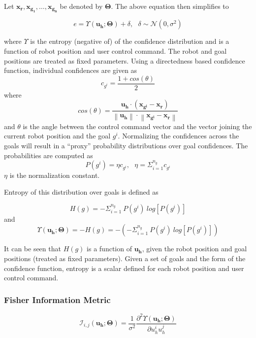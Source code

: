 \documentclass[]{article}
\newcommand{\norm}[1]{\left\lVert#1\right\rVert}
\begin{document}
\noindent Let $\boldsymbol{x_r}, \boldsymbol{x_{g_1}},\dots,\boldsymbol{x_{g_n}}$ be denoted by $\boldsymbol{\Theta}$. The above equation then simplifies to 

\begin{equation*}
e = \Upsilon(\boldsymbol{u_h}; \boldsymbol{\Theta}) + \delta, ~~~ \delta \sim \mathcal{N}(0, \sigma^2)
\end{equation*}


where $\Upsilon$ is the entropy (negative of) of the confidence distribution and is a function of robot position and user control command. The robot and goal positions are treated as fixed parameters. 
Using a directedness based confidence function, individual confidences are given as 
\begin{equation*}
c_{g^i} = \frac{1 + cos(\theta)}{2}
\end{equation*}
where 
\begin{equation*}
cos(\theta) = \frac{\boldsymbol{u_h}\cdot(\boldsymbol{x_{g^i}} - \boldsymbol{x_r})}{\norm{\boldsymbol{u_h}}\cdot\norm{\boldsymbol{x_{g^i}} - \boldsymbol{x_r}}}
\end{equation*}
and $\theta$ is the angle between the control command vector and the vector joining the current robot position and the goal $g^i$.
Normalizing the confidences across the goals will result in a ``proxy'' probability distributions over goal confidences. The probabilities are computed as
\begin{equation*}
P(g^i) = \eta c_{g^i} ,~~~  \eta = \Sigma_{i = 1}^{n_g} c_{g^i}
\end{equation*}
$\eta$ is the normalization constant. 

Entropy of this distribution over goals is defined as 

\begin{equation*}
H(g) = -\Sigma_{i = 1}^{n_g}~P(g^i)~log[P(g^i)]
\end{equation*}
and
\begin{equation*}
\Upsilon(\boldsymbol{u_h}; \boldsymbol{\Theta}) = -H(g) = -(-\Sigma_{i = 1}^{n_g}~P(g^i)~log[P(g^i)])
\end{equation*}

It can be seen that $H(g)$ is a function of $\boldsymbol{u_h}$, given the robot position and goal positions (treated as fixed parameters). Given a set of goals and the form of the confidence function, entropy is a scalar defined for each robot position and user control command. 

\subsubsection*{Fisher Information Metric}
\begin{equation*}
\mathcal{I}_{i,j}(\boldsymbol{u_h}; \boldsymbol{\Theta}) = \frac{1}{\sigma^2}\frac{\partial^2\Upsilon(\boldsymbol{u_h};\boldsymbol{\Theta})}{\partial u_h^iu_h^j}
\end{equation*}
\end{document}
